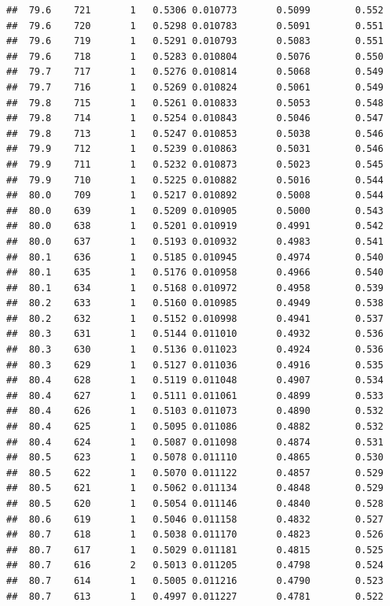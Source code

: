 \documentclass[
]{book}
\begin{document}
\begin{verbatim}
##  79.6    721       1   0.5306 0.010773       0.5099        0.552
##  79.6    720       1   0.5298 0.010783       0.5091        0.551
##  79.6    719       1   0.5291 0.010793       0.5083        0.551
##  79.6    718       1   0.5283 0.010804       0.5076        0.550
##  79.7    717       1   0.5276 0.010814       0.5068        0.549
##  79.7    716       1   0.5269 0.010824       0.5061        0.549
##  79.8    715       1   0.5261 0.010833       0.5053        0.548
##  79.8    714       1   0.5254 0.010843       0.5046        0.547
##  79.8    713       1   0.5247 0.010853       0.5038        0.546
##  79.9    712       1   0.5239 0.010863       0.5031        0.546
##  79.9    711       1   0.5232 0.010873       0.5023        0.545
##  79.9    710       1   0.5225 0.010882       0.5016        0.544
##  80.0    709       1   0.5217 0.010892       0.5008        0.544
##  80.0    639       1   0.5209 0.010905       0.5000        0.543
##  80.0    638       1   0.5201 0.010919       0.4991        0.542
##  80.0    637       1   0.5193 0.010932       0.4983        0.541
##  80.1    636       1   0.5185 0.010945       0.4974        0.540
##  80.1    635       1   0.5176 0.010958       0.4966        0.540
##  80.1    634       1   0.5168 0.010972       0.4958        0.539
##  80.2    633       1   0.5160 0.010985       0.4949        0.538
##  80.2    632       1   0.5152 0.010998       0.4941        0.537
##  80.3    631       1   0.5144 0.011010       0.4932        0.536
##  80.3    630       1   0.5136 0.011023       0.4924        0.536
##  80.3    629       1   0.5127 0.011036       0.4916        0.535
##  80.4    628       1   0.5119 0.011048       0.4907        0.534
##  80.4    627       1   0.5111 0.011061       0.4899        0.533
##  80.4    626       1   0.5103 0.011073       0.4890        0.532
##  80.4    625       1   0.5095 0.011086       0.4882        0.532
##  80.4    624       1   0.5087 0.011098       0.4874        0.531
##  80.5    623       1   0.5078 0.011110       0.4865        0.530
##  80.5    622       1   0.5070 0.011122       0.4857        0.529
##  80.5    621       1   0.5062 0.011134       0.4848        0.529
##  80.5    620       1   0.5054 0.011146       0.4840        0.528
##  80.6    619       1   0.5046 0.011158       0.4832        0.527
##  80.7    618       1   0.5038 0.011170       0.4823        0.526
##  80.7    617       1   0.5029 0.011181       0.4815        0.525
##  80.7    616       2   0.5013 0.011205       0.4798        0.524
##  80.7    614       1   0.5005 0.011216       0.4790        0.523
##  80.7    613       1   0.4997 0.011227       0.4781        0.522

\end{verbatim}
\end{document}
